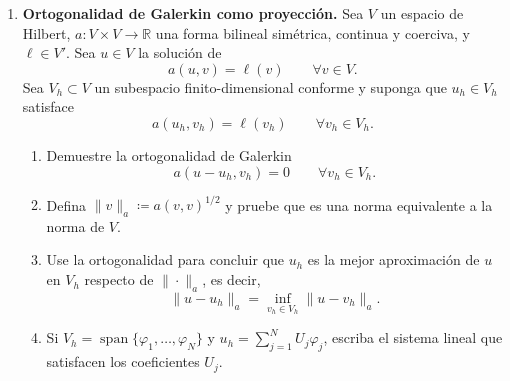\documentclass[11pt]{article}
\theoremstyle{thmstyle}
\def\R{\mathbb R}
\begin{document}
\begin{enumerate}[label=\textbf{\arabic*.}, leftmargin=*]
    \item \textbf{Ortogonalidad de Galerkin como proyecci\'on.} Sea $V$ un espacio de Hilbert, $a:V\times V\to\R$ una forma bilineal sim\'etrica, continua y coerciva, y $\ell\in V'$. Sea $u\in V$ la soluci\'on de
    \[
        a(u,v)=\ell(v)
        \qquad\forall v\in V.
    \]
    Sea $V_h\subset V$ un subespacio finito-dimensional conforme y suponga que $u_h\in V_h$ satisface
    \[
        a(u_h,v_h)=\ell(v_h)
        \qquad\forall v_h\in V_h.
    \]
    \begin{enumerate}[label=(\alph*)]
        \item Demuestre la ortogonalidad de Galerkin
        \[
            a(u-u_h,v_h)=0
            \qquad\forall v_h\in V_h.
        \]
        \item Defina $\|v\|_a\coloneqq a(v,v)^{1/2}$ y pruebe que es una norma equivalente a la norma de $V$.
        \item Use la ortogonalidad para concluir que $u_h$ es la mejor aproximaci\'on de $u$ en $V_h$ respecto de $\|\cdot\|_a$, es decir,
        \[
            \|u-u_h\|_a=\inf_{v_h\in V_h}\|u-v_h\|_a.
        \]
        \item Si $V_h=\operatorname{span}\{\varphi_1,\dots,\varphi_N\}$ y $u_h=\sum_{j=1}^N U_j\varphi_j$, escriba el sistema lineal que satisfacen los coeficientes $U_j$.
    \end{enumerate}

\end{enumerate}
\end{document}
